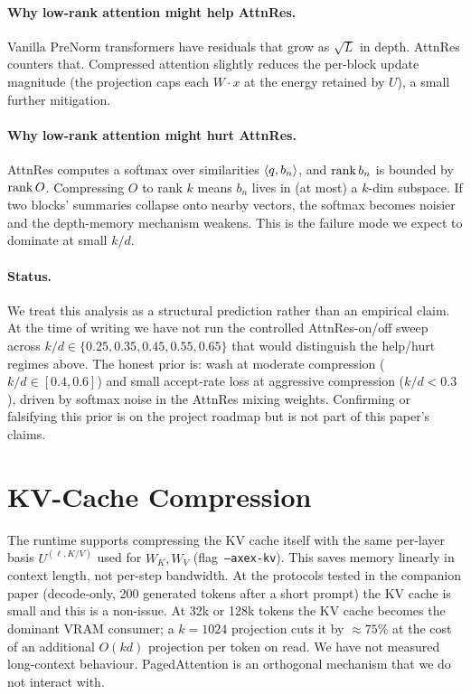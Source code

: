\documentclass[11pt]{article}
\begin{document}
\paragraph{Why low-rank attention might help AttnRes.}
Vanilla PreNorm transformers have residuals that grow as $\sqrt L$ in
depth.  AttnRes counters that.  Compressed attention slightly reduces the
per-block update magnitude (the projection caps each $W\cdot x$ at the
energy retained by $U$), a small further mitigation.

\paragraph{Why low-rank attention might hurt AttnRes.}
AttnRes computes a softmax over similarities $\langle q, b_n \rangle$, and
$\operatorname{rank} b_n$ is bounded by $\operatorname{rank} O$.  Compressing $O$ to rank $k$ means
$b_n$ lives in (at most) a $k$-dim subspace.  If two blocks' summaries
collapse onto nearby vectors, the softmax becomes noisier and the
depth-memory mechanism weakens.  This is the failure mode we expect to
dominate at small $k/d$.

\paragraph{Status.}  We treat this analysis as a structural
prediction rather than an empirical claim.  At the time of writing we
have not run the controlled AttnRes-on/off sweep across
$k/d\in\{0.25,0.35,0.45,0.55,0.65\}$ that would distinguish the
help/hurt regimes above.  The honest prior is: wash at moderate
compression ($k/d\in[0.4,0.6]$) and small accept-rate loss at aggressive
compression ($k/d<0.3$), driven by softmax noise in the AttnRes mixing
weights.  Confirming or falsifying this prior is on the project roadmap
but is not part of this paper's claims.

\section{KV-Cache Compression}
The runtime supports compressing the KV cache itself with the same
per-layer basis $U^{(\ell,K/V)}$ used for $W_K,W_V$
(flag~\texttt{--axex-kv}).  This saves memory linearly in context length,
not per-step bandwidth.  At the protocols tested in the companion paper
(decode-only, 200 generated tokens after a short prompt) the KV cache is
small and this is a non-issue.  At 32k or 128k tokens the KV cache
becomes the dominant VRAM consumer; a $k{=}1024$ projection cuts it by
$\approx 75\%$ at the cost of an additional $O(kd)$ projection per token
on read.  We have not measured long-context behaviour.  PagedAttention
\cite{kwon2023vllm} is an orthogonal mechanism that we do not interact
with.
\end{document}

